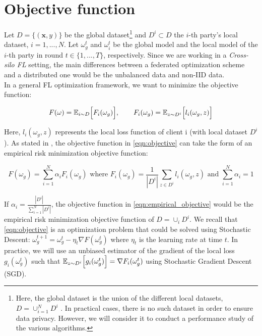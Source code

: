 \section{Objective function}

Let $D = \{(\mathbf{x}, y)\}$ be the global dataset\footnote{Here, the global dataset is the union of the different local datasets, $D = \cup_{i=1}^N D^i$ . In practical cases, there is no such dataset in order to ensure data privacy. However, we will consider it to conduct a performance study of the various algorithms.} and $D^i \subset D$ the $i$-th party's local dataset, $i=1,...,N$.
Let $\omega_g^t$ and $\omega_i^t$ be the global model and the local model of the $i$-th party in round $t\in \{1,...,T\}$, respectively. Since we are working in a \textit{Cross-silo FL} setting, the main differences between a federated optimization scheme and a distributed one would be the unbalanced data and non-IID data.\\
In a general FL optimization framework, we want to minimize the objective function:

\begin{equation}
\label{eqn:objective}
F(\omega) = \mathbb{E}_{i \sim D}\Big[ F_i (\omega_g) \Big], \qquad F_i(\omega_g) = \mathbb{E}_{z \sim D^i}\Bigl[ l_i (\omega_g, z) \Bigr]
\end{equation}

Here, $l_i(\omega_g, z)$ represents the local loss function of client i (with local dataset $D^i$). As stated in \cite*{wang2021}, the objective function in \ref{eqn:objective}
can take the form of an empirical risk minimization objective function:

\begin{equation}
  \label{eqn:empirical_objective}
  F(\omega_g) = \sum_{i=1}^N \alpha_i F_i(\omega_g) \text{ where } F_i (\omega_g) = \frac{1}{|D^i|} \sum_{z \in D^i} l_i(\omega_g, z) \text{ and } \sum_{i=1}^N \alpha_i = 1
\end{equation}

If $\alpha_i = \frac{|D^i|}{\sum_{i=1}^N |D^i|}$, the objective function in \ref{eqn:empirical_objective} would be the empirical risk minimization objective function of $D = \cup_i D^i$. We recall that \ref{eqn:objective} is an optimization problem that could be solved using Stochastic Descent: $\omega_g^{t+1} = \omega_g^t - \eta_t \nabla F (\omega_g^t)$ where $\eta_t$ is the learning rate at time $t$. In practice, we will use an unbiased estimator of the gradient of the local loss $g_i (\omega_g^t)$ such that $\mathbb{E}_{z \sim D^i} \Bigl[ g_i (\omega_g^t) \Bigr] = \nabla F_i (\omega_g^t)$ using Stochastic Gradient Descent (SGD).

